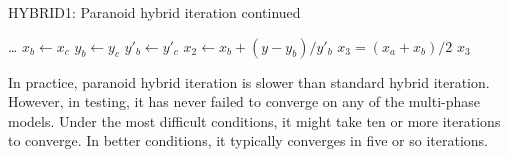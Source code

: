 \begin{algorithm}
\caption{HYBRID1: Paranoid hybrid iteration continued}
\begin{algorithmic}
        \State \ldots
    \Else {}
        \State $x_b \gets x_c$ 
        \State $y_b \gets y_c$
        \State $y'_b \gets y'_c$
        \State $x_2 \gets x_b + (y - y_b)/y'_b$ 
    \EndIf
    \State $x_3 = (x_a + x_b)/2$    
\EndWhile
\State \Return $x_3$    
\EndProcedure
\end{algorithmic}
\end{algorithm}

In practice, paranoid hybrid iteration is slower than standard hybrid iteration.  However, in testing, it has never failed to converge on any of the multi-phase models.  Under the most difficult conditions, it might take ten or more iterations to converge.  In better conditions, it typically converges in five or so iterations.
